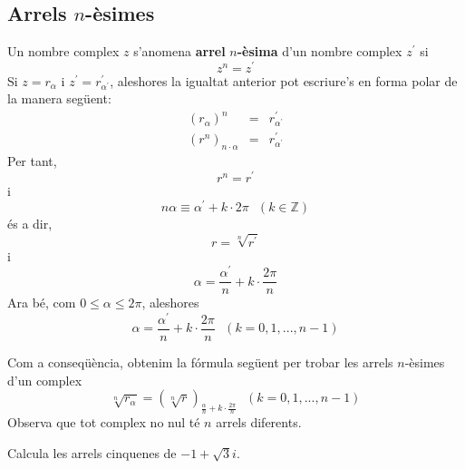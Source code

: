 \subsection{Arrels $n$-èsimes}

Un nombre complex $z$ s’anomena \textbf{arrel }$n$\textbf{-èsima}
d’un nombre complex $z^{\prime }$ si
\begin{equation*}
z^{n}=z^{\prime }
\end{equation*}
Si $z=r_{\alpha }$ i $z^{\prime }=r_{\alpha ^{\prime }}^{\prime }$, aleshores
la igualtat anterior pot escriure’s en forma polar de la manera següent:
\begin{eqnarray*}
\left( r_{\alpha }\right) ^{n} &=&r_{\alpha ^{\prime }}^{\prime } \\
\left( r^{n}\right) _{n\cdot \alpha } &=&r_{\alpha ^{\prime }}^{\prime }
\end{eqnarray*}
Per tant,
\begin{equation*}
r^{n}=r^{\prime }
\end{equation*}
i
\begin{equation*}
n\alpha \equiv \alpha ^{\prime }+k\cdot 2\pi \text{ \ \ }(k\in \mathbb{Z})
\end{equation*}
és a dir,
\begin{equation*}
r=\sqrt[n]{r^{\prime }}
\end{equation*}
i
\begin{equation*}
\alpha =\frac{\alpha ^{\prime }}{n}+k\cdot \frac{2\pi }{n}
\end{equation*}
Ara bé, com $0\leq \alpha \leq 2\pi $, aleshores
\begin{equation*}
\alpha =\frac{\alpha ^{\prime }}{n}+k\cdot \frac{2\pi }{n}\text{ \ }
(k=0,1,...,n-1)
\end{equation*}

Com a conseqüència, obtenim la fórmula següent per trobar les arrels $n$-èsimes d’un complex
\begin{equation*}
\sqrt[n]{r_{\alpha }}=\left( \sqrt[n]{r}\right) _{\frac{\alpha }{n}+k\cdot
\frac{2\pi }{n}}\text{ \ }(k=0,1,...,n-1)
\end{equation*}
Observa que tot complex no nul té $n$ arrels diferents.

\begin{exemple}
Calcula les arrels cinquenes de $-1+\sqrt{3}i$.
\end{exemple}

